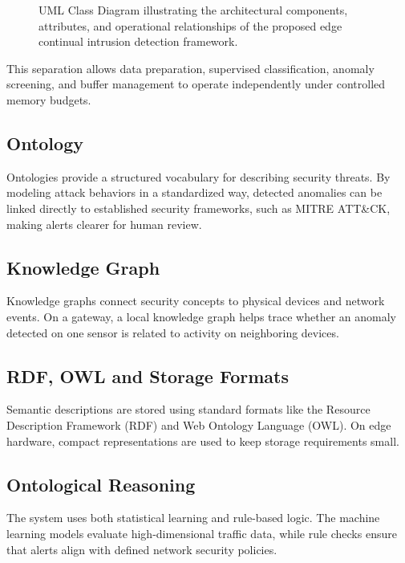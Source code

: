 \begin{figure}[htbp]
  \caption{UML Class Diagram illustrating the architectural components, attributes, and operational relationships of the proposed edge continual intrusion detection framework.}
  \label{fig:uml_class}
\end{figure}

This separation allows data preparation, supervised classification, anomaly screening, and buffer management to operate independently under controlled memory budgets.

\subsection{Ontology}
\label{subsec:ontology_concepts}
Ontologies provide a structured vocabulary for describing security threats. By modeling attack behaviors in a standardized way, detected anomalies can be linked directly to established security frameworks, such as MITRE ATT\&CK, making alerts clearer for human review.

\subsection{Knowledge Graph}
\label{subsec:knowledge_graphs}
Knowledge graphs connect security concepts to physical devices and network events. On a gateway, a local knowledge graph helps trace whether an anomaly detected on one sensor is related to activity on neighboring devices.

\subsection{RDF, OWL and Storage Formats}
\label{subsec:rdf_owl_storage}
Semantic descriptions are stored using standard formats like the Resource Description Framework (RDF) and Web Ontology Language (OWL). On edge hardware, compact representations are used to keep storage requirements small.

\subsection{Ontological Reasoning}
\label{subsec:ontological_reasoning}
The system uses both statistical learning and rule-based logic. The machine learning models evaluate high-dimensional traffic data, while rule checks ensure that alerts align with defined network security policies.

